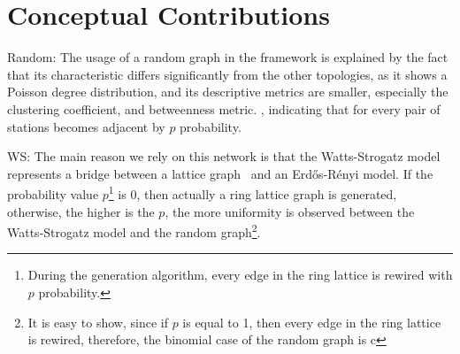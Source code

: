 \chapter{Conceptual Contributions}

Random:
	The usage of a random graph in the framework is explained by the fact that its characteristic differs significantly from the other topologies, as it shows a Poisson degree distribution, and its descriptive metrics are smaller, especially the clustering coefficient, and betweenness metric. , indicating that for every pair of stations becomes adjacent by $p$ probability. 
	
WS:
	The main reason we rely on this network is that the Watts-Strogatz model represents a bridge between a lattice graph~\cite{lattice} and an Erdős-Rényi model. If the probability value $p$\footnote{During the generation algorithm, every edge in the ring lattice is rewired with $p$ probability.} is 0, then actually a ring lattice graph is generated, otherwise, the higher is the $p$, the more uniformity is observed between the Watts-Strogatz model and the random graph\footnote{It is easy to show, since if $p$ is equal to 1, then every edge in the ring lattice is rewired, therefore, the binomial case of the random graph is c}.